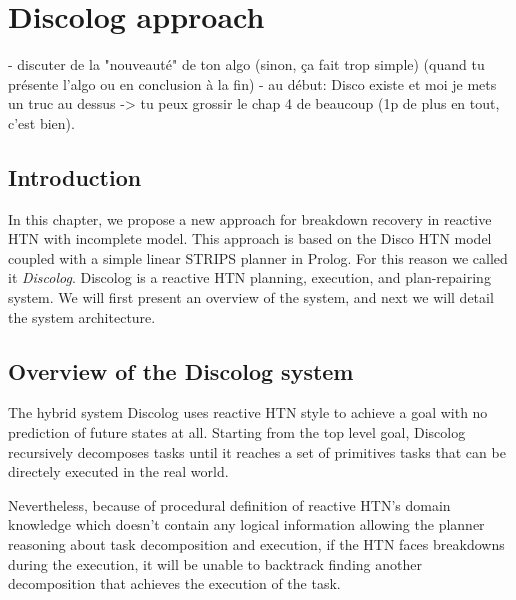 \chapter{Discolog approach} %

- discuter de la "nouveauté" de ton algo (sinon, ça fait trop simple) (quand tu présente l'algo ou en conclusion à la fin)
- au début: Disco existe et moi je mets un truc au dessus -> tu peux grossir le chap 4 de beaucoup (1p de plus en tout, c'est bien).

\label{Chapter 4} %
\section{Introduction}
In this chapter, we propose a new approach for breakdown recovery in reactive HTN with incomplete model. This approach is based on the Disco \cite{rich2009building} HTN model coupled with a simple linear STRIPS planner in Prolog. For this reason we called it \emph{Discolog}. Discolog is a reactive HTN planning, execution, and plan-repairing system. We will first present an overview of the system, and next we will detail the system architecture.


\section{Overview of the Discolog system}

The hybrid system Discolog uses reactive HTN style to achieve a goal with no prediction of future states at all.
Starting from the top level goal, Discolog recursively decomposes tasks until it reaches a set of primitives tasks that can be directely executed in the real world. 

Nevertheless, because of procedural definition of reactive HTN's domain knowledge which doesn't contain any logical information allowing the planner reasoning about task decomposition and execution, if the HTN faces breakdowns during the execution, it will be unable to backtrack  finding another decomposition that achieves the execution of the task.


